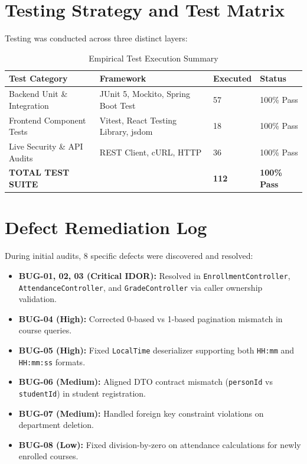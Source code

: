 \documentclass[12pt,a4paper,oneside]{report}
\begin{document}
\section{Testing Strategy and Test Matrix}
Testing was conducted across three distinct layers:
\begin{table}[h!]
\centering
\small
\begin{tabular}{p{}p{}p{}p{}}
\toprule
\textbf{Test Category} & \textbf{Framework} & \textbf{Executed} & \textbf{Status} \\
\midrule
Backend Unit \& Integration & JUnit 5, Mockito, Spring Boot Test & 57 & 100\% Pass \\
Frontend Component Tests & Vitest, React Testing Library, jsdom & 18 & 100\% Pass \\
Live Security \& API Audits & REST Client, cURL, HTTP & 36 & 100\% Pass \\
\textbf{TOTAL TEST SUITE} & & \textbf{112} & \textbf{100\% Pass} \\
\bottomrule
\end{tabular}
\caption{Empirical Test Execution Summary}
\end{table}

\section{Defect Remediation Log}
During initial audits, 8 specific defects were discovered and resolved:
\begin{itemize}
    \item \textbf{BUG-01, 02, 03 (Critical IDOR):} Resolved in \texttt{EnrollmentController}, \texttt{AttendanceController}, and \texttt{GradeController} via caller ownership validation.
    \item \textbf{BUG-04 (High):} Corrected 0-based vs 1-based pagination mismatch in course queries.
    \item \textbf{BUG-05 (High):} Fixed \texttt{LocalTime} deserializer supporting both \texttt{HH:mm} and \texttt{HH:mm:ss} formats.
    \item \textbf{BUG-06 (Medium):} Aligned DTO contract mismatch (\texttt{personId} vs \texttt{studentId}) in student registration.
    \item \textbf{BUG-07 (Medium):} Handled foreign key constraint violations on department deletion.
    \item \textbf{BUG-08 (Low):} Fixed division-by-zero on attendance calculations for newly enrolled courses.
\end{itemize}
\end{document}
